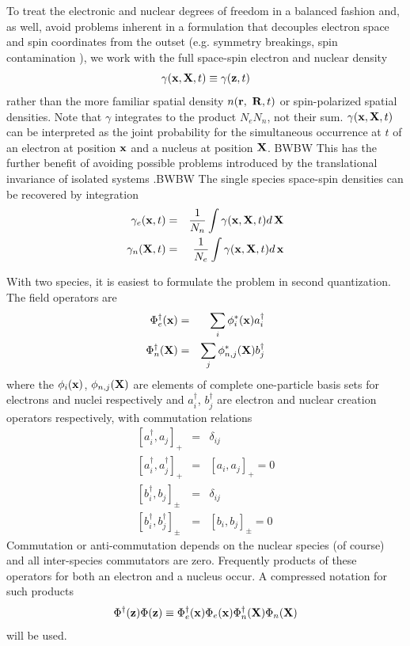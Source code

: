To treat the electronic and nuclear degrees of freedom in a balanced fashion
and, as well, avoid problems inherent in a formulation that decouples
electron space and spin coordinates from the outset (e.g. symmetry
breakings, spin contamination \cite{PerdewSavin,BLWSBT98,SavinSem2}), we
work with the full space-spin electron and nuclear density 
\begin{equation}
\gamma ({\bf x},{\bf X},t)\equiv \gamma ({\bf z},t)  \label{gammadef}
\end{equation}%
rather than the more familiar spatial density $n({\bf r},{\bf \ R},t)$ or
spin-polarized spatial densities. Note that $\gamma $ integrates to the
product $N_{e}N_{n}$, not their sum. $\gamma ({\bf x},{\bf X},t)$ can be
interpreted as the joint probability for the simultaneous occurrence at $t$
of an electron at position ${\bf x}$ and a nucleus at position ${\bf X}$.
BWBW This has the further benefit of avoiding possible problems introduced
by the translational invariance of isolated systems \cite{KreibGross}.BWBW
The single species space-spin densities can be recovered by integration 
\begin{eqnarray}
\gamma _{e}({\bf x},t) &=&\frac{1}{N_{n}}\int \gamma ({\bf x},{\bf X},t)d\,%
{\bf X}  \nonumber \\
\gamma _{n}({\bf X},t) &=&\frac{1}{N_{e}}\int \gamma ({\bf x},{\bf X},t)d\,%
{\bf x}
\end{eqnarray}

With two species, it is easiest to formulate the problem in second
quantization. The field operators are 
\begin{eqnarray}
\Phi^{\dagger}_{e}({\bf x}) & = & \sum_{i} \phi^{*}_{i}({\bf x}%
)a_{i}^{\dagger}  \nonumber \\
\Phi^{\dagger}_{n}({\bf X}) & = & \sum_{j} \phi_{n,j}^{*}({\bf X}%
)b_{j}^{\dagger}  \label{fieldop}
\end{eqnarray}
where the $\phi_{i}({\bf x})$, $\phi_{n,j}({\bf X})$ are elements of
complete one-particle basis sets for electrons and nuclei respectively and $%
a_{i}^{\dagger}$, $b_{j}^{\dagger}$ are electron and nuclear creation
operators respectively, with commutation relations 
\begin{eqnarray}
\left[ a_{i}^{\dagger}, a_{j} \right]_{+} & = & \delta_{ij}  \nonumber \\
\left[ a_{i}^{\dagger}, a^{\dagger}_{j} \right]_{+} & = & \left[ a_{i},
a_{j} \right]_{+} = 0  \nonumber \\
\left[ b_{i}^{\dagger}, b_{j} \right]_{\pm} & = & \delta_{ij}  \nonumber \\
\left[ b_{i}^{\dagger}, b^{\dagger}_{j} \right]_{\pm} & = & \left[
b_{i},b_{j} \right]_{\pm} = 0
\end{eqnarray}
Commutation or anti-commutation depends on the nuclear species (of course)
and all inter-species commutators are zero. Frequently products of these
operators for both an electron and a nucleus occur. A compressed notation
for such products 
\begin{equation}
\Phi^{\dagger}({\bf z})\Phi ({\bf z}) \equiv\Phi^{\dagger}_{e}({\bf x})
\Phi_{e}({\bf x})\Phi^{\dagger}_{n}({\bf X}) \Phi_{n}({\bf X})
\label{fieldopprod}
\end{equation}
will be used.

